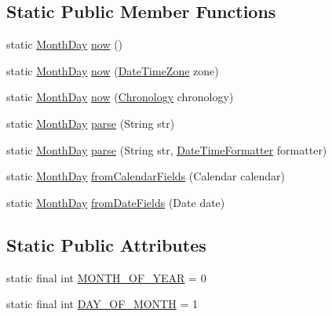 \subsection*{Static Public Member Functions}
\begin{DoxyCompactItemize}
\item 
static \hyperlink{classorg_1_1joda_1_1time_1_1_month_day}{Month\-Day} \hyperlink{classorg_1_1joda_1_1time_1_1_month_day_a0d5226899fd560c418825043d98b60de}{now} ()
\item 
static \hyperlink{classorg_1_1joda_1_1time_1_1_month_day}{Month\-Day} \hyperlink{classorg_1_1joda_1_1time_1_1_month_day_a695256dc761fe2b36f098481c37f7887}{now} (\hyperlink{classorg_1_1joda_1_1time_1_1_date_time_zone}{Date\-Time\-Zone} zone)
\item 
static \hyperlink{classorg_1_1joda_1_1time_1_1_month_day}{Month\-Day} \hyperlink{classorg_1_1joda_1_1time_1_1_month_day_aacec512bfa72efc430b25e49cc216ed9}{now} (\hyperlink{classorg_1_1joda_1_1time_1_1_chronology}{Chronology} chronology)
\item 
static \hyperlink{classorg_1_1joda_1_1time_1_1_month_day}{Month\-Day} \hyperlink{classorg_1_1joda_1_1time_1_1_month_day_af023fefe7d8e43221dcafc816e7f5eb9}{parse} (String str)
\item 
static \hyperlink{classorg_1_1joda_1_1time_1_1_month_day}{Month\-Day} \hyperlink{classorg_1_1joda_1_1time_1_1_month_day_afba95bcf4822e5ebfee41d44944573d8}{parse} (String str, \hyperlink{classorg_1_1joda_1_1time_1_1format_1_1_date_time_formatter}{Date\-Time\-Formatter} formatter)
\item 
static \hyperlink{classorg_1_1joda_1_1time_1_1_month_day}{Month\-Day} \hyperlink{classorg_1_1joda_1_1time_1_1_month_day_a4180d5a9acc5bbffcb4600807e31d441}{from\-Calendar\-Fields} (Calendar calendar)
\item 
static \hyperlink{classorg_1_1joda_1_1time_1_1_month_day}{Month\-Day} \hyperlink{classorg_1_1joda_1_1time_1_1_month_day_a2d36b641b1597d7c253ec53598043a49}{from\-Date\-Fields} (Date date)
\end{DoxyCompactItemize}
\subsection*{Static Public Attributes}
\begin{DoxyCompactItemize}
\item 
static final int \hyperlink{classorg_1_1joda_1_1time_1_1_month_day_aae75da69871f881b0be9da952cf51b5a}{M\-O\-N\-T\-H\-\_\-\-O\-F\-\_\-\-Y\-E\-A\-R} = 0
\item 
static final int \hyperlink{classorg_1_1joda_1_1time_1_1_month_day_a2cd2f4484b1f079a20f292a60b3233d1}{D\-A\-Y\-\_\-\-O\-F\-\_\-\-M\-O\-N\-T\-H} = 1
\end{DoxyCompactItemize}
